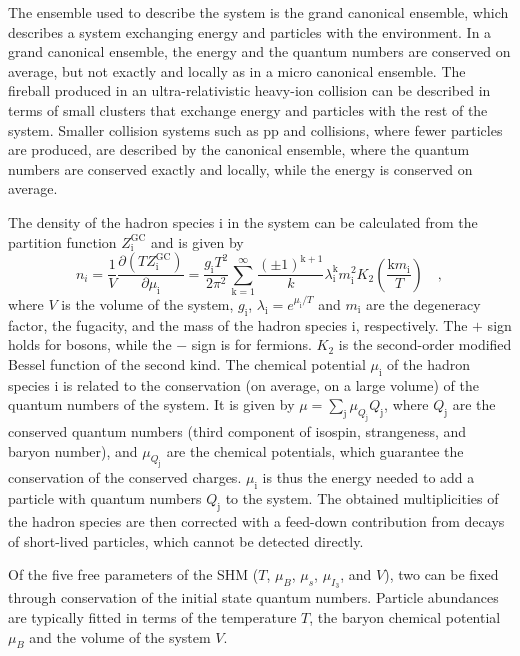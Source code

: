 The ensemble used to describe the system is the grand canonical ensemble, which describes a system exchanging energy and particles with the environment. In a grand canonical ensemble, the energy and the quantum numbers are conserved on average, but not exactly and locally as in a micro canonical ensemble. The fireball produced in an ultra-relativistic heavy-ion collision can be described in terms of small clusters that exchange energy and particles with the rest of the system. Smaller collision systems such as pp and \ee collisions, where fewer particles are produced, are described by the canonical ensemble, where the quantum numbers are conserved exactly and locally, while the energy is conserved on average.

The density of the hadron species i in the system can be calculated from the partition function $Z_\mathrm{i}^\mathrm{GC}$ and is given by
\begin{equation*}
    n_i = \frac{1}{V} \frac{\partial(TZ_\mathrm{i}^\mathrm{GC})}{\partial\mu_\mathrm{i}} = \frac{g_\mathrm{i}T^2}{2\pi^2}\sum_\mathrm{k=1}^\infty \frac{(\pm1)^\mathrm{k+1}}{k}\lambda_\mathrm{i}^\mathrm{k}m^2_\mathrm{i} K_2\left(\frac{\mathrm{k}m_\mathrm{i}}{T}\right) \quad ,
\end{equation*}
where $V$ is the volume of the system, $g_\mathrm{i}$, $\lambda_\mathrm{i} = e^{\mu_\mathrm{i}/T}$ and $m_\mathrm{i}$ are the degeneracy factor, the fugacity, and the mass of the hadron species i, respectively. The $+$ sign holds for bosons, while the $-$ sign is for fermions. $K_2$ is the second-order modified Bessel function of the second kind. The chemical potential $\mu_\mathrm{i}$ of the hadron species i is related to the conservation (on average, on a large volume) of the quantum numbers of the system. It is given by $\mu = \sum_\mathrm{j} \mu_{Q_\mathrm{j}}  Q_\mathrm{j}$, where $Q_\mathrm{j}$ are the conserved quantum numbers (third component of isospin, strangeness, and baryon number), and $\mu_{Q_\mathrm{j}}$ are the chemical potentials, which guarantee the conservation of the conserved charges. $\mu_\mathrm{i}$ is thus the energy needed to add a particle with quantum numbers $Q_\mathrm{j}$ to the system. The obtained multiplicities of the hadron species are then corrected with a feed-down contribution from decays of short-lived particles, which cannot be detected directly.

Of the five free parameters of the SHM ($T$, $\mu_{B}$, $\mu_{s}$, $\mu_{I_\mathrm{3}}$, and $V$), two can be fixed through conservation of the initial state quantum numbers. Particle abundances are typically fitted in terms of the temperature $T$, the baryon chemical potential $\mu_{B}$ and the volume of the system $V$. 


